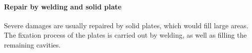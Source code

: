 \paragraph{Repair by welding and solid plate}

Severe damages are usually repaired by solid plates, which would fill large
areas. The fixation process of the plates is carried out by welding, as well
as filling the remaining cavities. 















